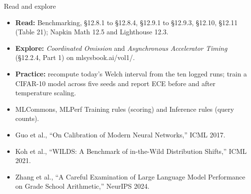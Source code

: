 \documentclass[aspectratio=169, 12pt]{beamer}
\begin{document}
\begin{frame}{Read and explore}
  \vspace{-0.1cm}
  \footnotesize
  \begin{itemize}\setlength{\itemsep}{0.05cm}
    \item \textbf{Read:} Benchmarking, \S12.8.1 to \S12.8.4, \S12.9.1 to \S12.9.3, \S12.10, \S12.11 (Table 21); Napkin Math 12.5 and Lighthouse 12.3.
    \item \textbf{Explore:} \textit{Coordinated Omission} and \textit{Asynchronous Accelerator Timing} (\S12.2.4, Part 1) on mlsysbook.ai/vol1/.
    \item \textbf{Practice:} recompute today's Welch interval from the ten logged runs; train a CIFAR-10 model across five seeds and report ECE before and after temperature scaling.
    \item MLCommons, MLPerf Training rules (scoring) and Inference rules (query counts).
    \item Guo et al., ``On Calibration of Modern Neural Networks,'' ICML 2017.
    \item Koh et al., ``WILDS: A Benchmark of in-the-Wild Distribution Shifts,'' ICML 2021.
    \item Zhang et al., ``A Careful Examination of Large Language Model Performance on Grade School Arithmetic,'' NeurIPS 2024.
  \end{itemize}
\end{frame}
\end{document}
